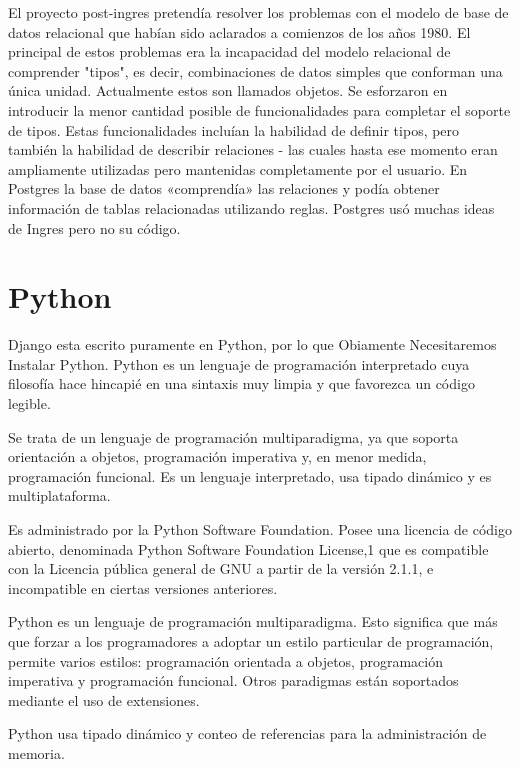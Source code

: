 El proyecto post-ingres pretendía resolver los problemas con el modelo de base
de datos relacional que habían sido aclarados a comienzos de los años 1980. El
principal de estos problemas era la incapacidad del modelo relacional de
comprender "tipos", es decir, combinaciones de datos simples que conforman una
única unidad. Actualmente estos son llamados objetos. Se esforzaron en introducir
la menor cantidad posible de funcionalidades para completar el soporte de tipos.
Estas funcionalidades incluían la habilidad de definir tipos, pero también
la habilidad de describir relaciones - las cuales hasta ese momento eran
ampliamente utilizadas pero mantenidas completamente por el usuario. En Postgres
la base de datos «comprendía» las relaciones y podía obtener información de
tablas relacionadas utilizando reglas. Postgres usó muchas ideas de Ingres
pero no su código.


\section{Python}

Django esta escrito puramente en Python, por lo que Obiamente Necesitaremos Instalar
Python. Python es un lenguaje de programación interpretado cuya filosofía hace
 hincapié en una sintaxis muy limpia y que favorezca un código legible.
 
Se trata de un lenguaje de programación multiparadigma, ya que soporta
orientación a objetos, programación imperativa y, en menor medida, programación
funcional. Es un lenguaje interpretado, usa tipado dinámico y es multiplataforma.

Es administrado por la Python Software Foundation. Posee una licencia de código
abierto, denominada Python Software Foundation License,1 que es compatible con
la Licencia pública general de GNU a partir de la versión 2.1.1, e
incompatible en ciertas versiones anteriores.

Python es un lenguaje de programación multiparadigma. Esto significa que más
que forzar a los programadores a adoptar un estilo particular de programación,
permite varios estilos: programación orientada a objetos, programación imperativa
y programación funcional. Otros paradigmas están soportados mediante el uso
de extensiones.

Python usa tipado dinámico y conteo de referencias para la administración
de memoria.

